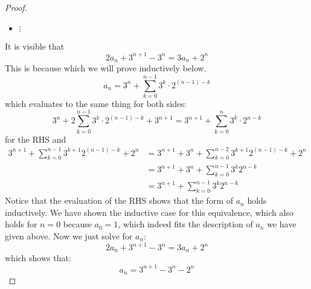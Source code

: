 \documentclass{article}
\begin{document}
\begin{proof}
\begin{itemize}
                \item $\vdots $ 
            \end{itemize}
        It is visible that 
            \begin{equation*}
                2a_{n} + 3^{n + 1} - 3^{n} = 3a_{n}+ 2^{n}
            \end{equation*}
        This is because which we will prove inductively below. 
            \begin{equation*}
                a_{n} = 3^{n} + \sum_{k = 0}^{n - 1}3^{k} \cdot 2^{(n - 1) - k}
            \end{equation*}
        which evaluates to the same thing for both sides:
            \begin{equation*}
                3^{n} + 2\sum_{k = 0}^{n - 1}3^{k} \cdot 2^{(n - 1)  - k} + 3^{n + 1} = 3^{n + 1} + \sum_{k = 0}^{n}3^{k} \cdot 2^{n - k}
            \end{equation*}
        for the RHS and 
            \begin{align*}
                3^{n + 1} + \sum_{k = 0}^{n - 1}3^{k + 1}2^{(n - 1)- k} + 2^{n} &= 3^{n + 1} + 3^{n} + \sum_{k = 0}^{n - 2}3^{k + 1}2^{(n - 1)- k} + 2^{n} \\
                                                                                &= 3^{n + 1} + 3^{n} + \sum_{k = 0}^{n - 1} 3^{k}2^{n - k} \\
                                                                                &= 3^{n + 1} + \sum_{k =0}^{n - 1}3^{k}2^{n - k}
            \end{align*}
        Notice that the evaluation of the RHS shows that the form of $a_{n}$ holds inductively. We have shown the inductive case for this equivalence, which also holds for $n = 0$ because $a_{0} = 1$, which indeed fits the description of $a_{n}$ we have given above. Now we just solve for $a_{n}$:
            \begin{equation*}
                2a_{n} + 3^{n + 1} - 3^{n} = 3a_{n} + 2^{n}
            \end{equation*}
        which shows that:
            \begin{equation*}
                a_{n} = 3^{n + 1} - 3^{n} - 2^{n}
            \end{equation*}
    \end{proof}
\end{document}

